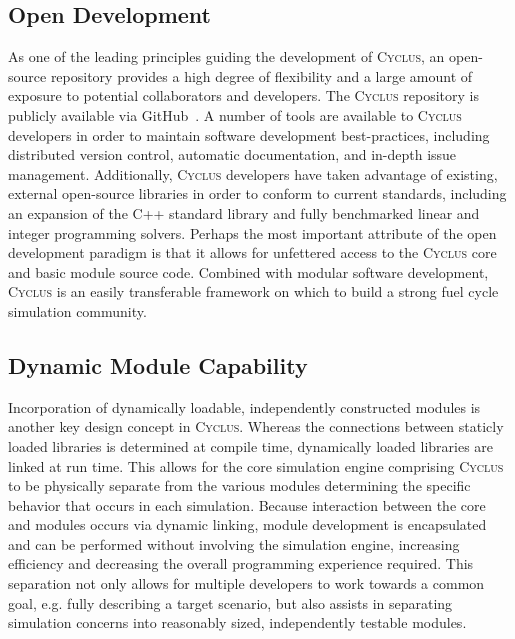 \documentclass{anstrans}
\begin{document}
\subsection{Open Development}
As one of the leading principles guiding the development of
\textsc{Cyclus}, an open-source repository provides a high degree of
flexibility and a large amount of exposure to potential collaborators
and developers. The \textsc{Cyclus} repository is publicly available via
GitHub~\cite{cyclus2012}. A number of tools are available to
\textsc{Cyclus} developers in order to maintain software development
best-practices, including distributed version control, automatic
documentation, and in-depth issue management. Additionally,
\textsc{Cyclus} developers have taken advantage of existing, external
open-source libraries in order to conform to current standards,
including an expansion of the C++ standard library and fully
benchmarked linear and integer programming solvers. Perhaps the most
important attribute of the open development paradigm is that it allows
for unfettered access to the \textsc{Cyclus} core and basic module
source code. Combined with modular software development, \textsc{Cyclus}
is an easily transferable framework on which to build a strong fuel
cycle simulation community.

\subsection{Dynamic Module Capability}
Incorporation of dynamically loadable, independently constructed
modules is another key design concept in \textsc{Cyclus}. Whereas the
connections between staticly loaded libraries is determined at compile time,
dynamically loaded libraries are linked at run time. This allows for the core
simulation engine comprising \textsc{Cyclus} to be physically separate from
the various modules determining the specific behavior that occurs in
each simulation.  Because interaction between the core and modules occurs via
dynamic linking, module development is encapsulated and can be performed without involving
the simulation engine, increasing efficiency and decreasing the
overall programming experience required. This separation
not only allows for multiple developers to work towards a common goal,
e.g. fully describing a target scenario, but also assists in
separating simulation concerns into reasonably sized, independently
testable modules.

\end{document}
